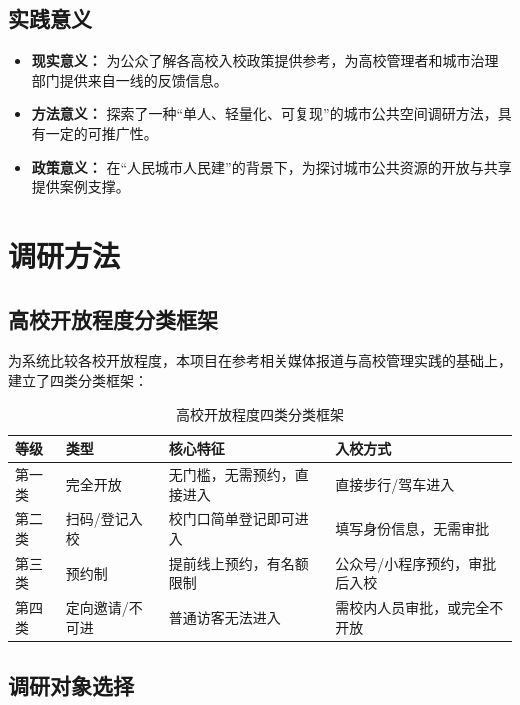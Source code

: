 \documentclass[12pt]{article}
\begin{document}
\subsection{实践意义}

\begin{itemize}[leftmargin=2em]
    \item \textbf{现实意义：} 为公众了解各高校入校政策提供参考，为高校管理者和城市治理部门提供来自一线的反馈信息。
    \item \textbf{方法意义：} 探索了一种“单人、轻量化、可复现”的城市公共空间调研方法，具有一定的可推广性。
    \item \textbf{政策意义：} 在“人民城市人民建”的背景下，为探讨城市公共资源的开放与共享提供案例支撑。
\end{itemize}


\section{调研方法}

\subsection{高校开放程度分类框架}

为系统比较各校开放程度，本项目在参考相关媒体报道与高校管理实践的基础上，建立了四类分类框架：

\begin{table}[H]
\centering
\caption{高校开放程度四类分类框架}
\label{tab:framework}
\begin{tabular}{p{2.5cm}p{3.5cm}p{5cm}p{4cm}}
\toprule
\textbf{等级} & \textbf{类型} & \textbf{核心特征} & \textbf{入校方式} \\
\midrule
第一类 & 完全开放 & 无门槛，无需预约，直接进入 & 直接步行/驾车进入 \\
第二类 & 扫码/登记入校 & 校门口简单登记即可进入 & 填写身份信息，无需审批 \\
第三类 & 预约制 & 提前线上预约，有名额限制 & 公众号/小程序预约，审批后入校 \\
第四类 & 定向邀请/不可进 & 普通访客无法进入 & 需校内人员审批，或完全不开放 \\
\bottomrule
\end{tabular}
\end{table}

\subsection{调研对象选择}
\end{document}
